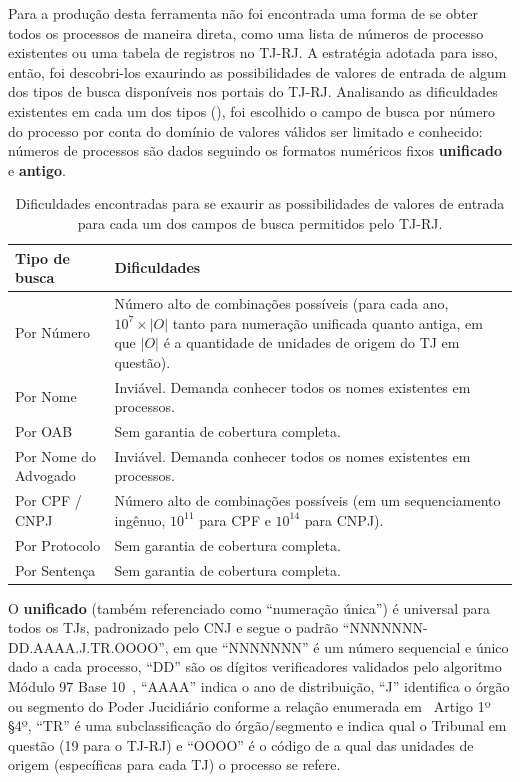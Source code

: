 Para a produção desta ferramenta não foi encontrada uma forma de se obter todos
os processos de maneira direta, como uma lista de números de processo
existentes ou uma tabela de registros no TJ-RJ. A estratégia adotada para isso,
então, foi descobri-los exaurindo as possibilidades de valores de entrada de
algum dos tipos de busca disponíveis nos portais do TJ-RJ. Analisando as
dificuldades existentes em cada um dos tipos
(), foi escolhido o campo de busca por
número do processo por conta do domínio de valores válidos ser limitado e
conhecido: números de processos são dados seguindo os formatos numéricos fixos
\textbf{unificado} e \textbf{antigo}.

\begin{table}[htb]
    \centering
    \begin{tabular}{lp{}}
        \toprule
        Tipo de busca & Dificuldades \\
        \midrule
        Por Número & Número alto de combinações possíveis (para cada ano,
                     $10^{7} \times |O|$ tanto para numeração unificada quanto
                     antiga, em que $|O|$ é a quantidade de unidades de origem
                     do TJ em questão). \\
        Por Nome & Inviável. Demanda conhecer todos os nomes existentes em processos. \\
        Por OAB & Sem garantia de cobertura completa. \\
        Por Nome do Advogado & Inviável. Demanda conhecer todos os nomes existentes em processos. \\
        Por CPF / CNPJ & Número alto de combinações possíveis (em um sequenciamento ingênuo, $10^{11}$ para CPF e $10^{14}$ para CNPJ). \\
        Por Protocolo & Sem garantia de cobertura completa. \\
        Por Sentença & Sem garantia de cobertura completa. \\
        \bottomrule
    \end{tabular}
    \caption{%
        Dificuldades encontradas para se exaurir as possibilidades de valores
        de entrada para cada um dos campos de busca permitidos pelo TJ-RJ.
    }
    \label{tbl:dificuldades-tipos-de-busca}
\end{table}

O \textbf{unificado} (também referenciado como ``numeração única'') é universal
para todos os TJs, padronizado pelo CNJ
\cite{spec:cnj-numeração-única,spec:cnj-numeração-única-resolução} e segue o
padrão ``NNNNNNN-DD.AAAA.J.TR.OOOO'', em que ``NNNNNNN'' é um número sequencial
e único dado a cada processo, ``DD'' são os dígitos verificadores validados
pelo algoritmo Módulo 97 Base 10~\cite{spec:iso-modulo-97}, ``AAAA'' indica o
ano de distribuição, ``J'' identifica o órgão ou segmento do Poder Jucidiário
conforme a relação enumerada em~\cite{spec:cnj-numeração-única-resolução}
Artigo 1º \S 4º, ``TR'' é uma subclassificação do órgão/segmento e indica qual
o Tribunal em questão (19 para o TJ-RJ) e ``OOOO'' é o código de a qual das
unidades de origem (específicas para cada TJ) o processo se refere.

